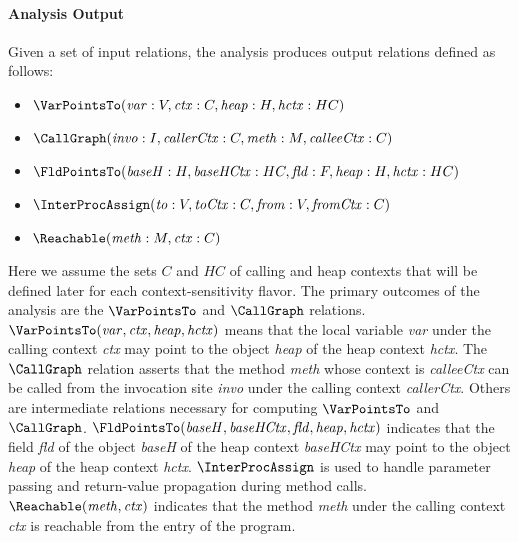 {\paragraph{Analysis Output}
Given a set of input relations, 
the analysis produces output relations defined as follows: 
\begin{itemize}
\item $\VarPointsTo({\it var}: V, {\it ctx}: C, {\it heap}: H, {\it hctx}: HC)$
\item
  $\CallGraph({\it invo}: I, {\it callerCtx}: C, {\it meth}: M, {\it
    calleeCtx}: C)$
\item
  $\FldPointsTo({\it baseH}: H, {\it baseHCtx}: HC, {\it fld}: F, {\it
    heap}: H, {\it hctx}: HC)$
\item
  $\InterProcAssign({\it to}:V, {\it toCtx}: C, {\it from}: V, {\it
    fromCtx}: C)$
\item $\Reachable({\it meth}: M,{\it ctx}: C)$
\end{itemize}
Here we assume the sets $C$ and $HC$ of calling and heap contexts
that will be defined later for each context-sensitivity flavor.  The
primary outcomes of the analysis are the $\VarPointsTo$ and
$\CallGraph$ relations.
$\VarPointsTo({\it var}, {\it ctx}, {\it heap}, {\it hctx})$ means
that the local variable {\it var} under the calling context {\it ctx}
may point to the object {\it heap} of the heap context {\it hctx}.
The $\CallGraph$ relation asserts that the method {\it meth} whose
context is {\it calleeCtx} can be called from the invocation site {\it
  invo} under the calling context {\it callerCtx}.  Others are
intermediate relations necessary for computing $\VarPointsTo$ and
$\CallGraph$.
$\FldPointsTo({\it baseH}, {\it baseHCtx}, {\it fld}, {\it heap}, {\it
  hctx})$ indicates that the field {\it fld} of the object {\it baseH}
of the heap context {\it baseHCtx} may point to the object {\it heap}
of the heap context {\it hctx}.  $\InterProcAssign$ is used to handle
parameter passing and return-value propagation during method calls.
$\Reachable({\it meth},{\it ctx})$ indicates that the method {\it
  meth} under the calling context {\it ctx} is reachable from the
entry of the program.


}
